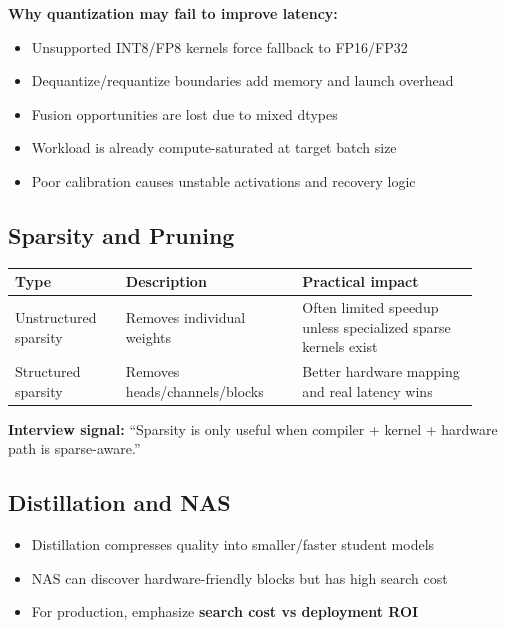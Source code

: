 \documentclass[11pt]{article}
\begin{document}
\textbf{Why quantization may fail to improve latency:}
\begin{itemize}[leftmargin=*]
\item Unsupported INT8/FP8 kernels force fallback to FP16/FP32
\item Dequantize/requantize boundaries add memory and launch overhead
\item Fusion opportunities are lost due to mixed dtypes
\item Workload is already compute-saturated at target batch size
\item Poor calibration causes unstable activations and recovery logic
\end{itemize}

\subsection{Sparsity and Pruning}
\begin{center}
\begin{tabular}{|p{0.22\linewidth}|p{0.35\linewidth}|p{0.35\linewidth}|}
\hline
\textbf{Type} & \textbf{Description} & \textbf{Practical impact} \\
\hline
Unstructured sparsity & Removes individual weights & Often limited speedup unless specialized sparse kernels exist \\
\hline
Structured sparsity & Removes heads/channels/blocks & Better hardware mapping and real latency wins \\
\hline
\end{tabular}
\end{center}

\begin{tcolorbox}[colback=insight]
\textbf{Interview signal:} ``Sparsity is only useful when compiler + kernel + hardware path is sparse-aware.''
\end{tcolorbox}

\subsection{Distillation and NAS}
\begin{itemize}[leftmargin=*]
\item Distillation compresses quality into smaller/faster student models
\item NAS can discover hardware-friendly blocks but has high search cost
\item For production, emphasize \textbf{search cost vs deployment ROI}
\end{itemize}
\end{document}
